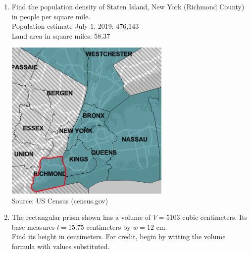 \documentclass[12pt, twoside]{article}
\begin{document}
\begin{enumerate}
\newpage
\item Find the population density of Staten Island, New York (Richmond County) in people per square mile.\\[0.5cm]
Population estimate July 1, 2019: 476,143\\[0.25cm]
Land area in square miles: 58.37
\begin{flushright}
  \includegraphics[width=8cm]{6-17-7-StatenIsland.png}\\
  Source: US Census (census.gov)
\end{flushright}

\newpage
\item The rectangular prism shown has a volume of $V=5103$ cubic centimeters. Its base measures $l=15.75$ centimeters by $w=12$ cm. \\[0.5cm]
Find its height in centimeters. For credit, begin by writing the volume formula with values substituted.
\begin{flushright}
\end{flushright}


\end{enumerate}
\end{document}
